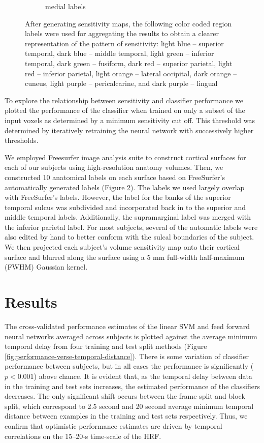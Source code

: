 \documentclass[preprint,5p,authoryear]{elsarticle}
\begin{document}
\begin{figure}
\begin{subfigure}{0.3\textwidth}
\caption{medial labels}
\label{fig:medial-labels}
\end{subfigure}
\caption{After generating sensitivity maps, the following color coded region labels were used for aggregating the results to obtain a clearer representation of the pattern of sensitivity: light blue -- superior temporal, dark blue -- middle temporal, light green -- inferior temporal, dark green -- fusiform, dark red -- superior parietal, light red -- inferior parietal, light orange -- lateral occipital, dark orange -- cuneus, light purple -- pericalcarine, and dark purple -- lingual}
\label{fig:labels}
\end{figure}

To  explore the relationship between sensitivity and classifier performance we plotted the performance of the classifier when trained on only a subset of the input voxels as determined by a minimum sensitivity cut off.
This threshold was determined by iteratively retraining the neural network with successively higher thresholds.

We employed Freesurfer image analysis suite to construct cortical surfaces for each of our subjects using high-resolution anatomy volumes.
Then, we constructed 10 anatomical labels on each surface based on FreeSurfer's automatically generated labels (Figure \ref{fig:labels}).
The labels we used largely overlap with FreeSurfer's labels.
However, the label for the banks of the superior temporal sulcus was subdivided and incorporated back in to the superior and middle temporal labels.
Additionally, the supramarginal label was merged with the inferior parietal label.
For most subjects, several of the automatic labels were also edited by hand to better conform with the sulcal boundaries of the subject.
We then projected each subject's volume sensitivity map onto their cortical surface and blurred along the surface using a 5 mm full-width half-maximum (FWHM) Gaussian kernel.

\section{Results}
The cross-validated performance estimates of the linear SVM and feed forward neural networks averaged across subjects is plotted against the average minimum temporal delay from four training and test split methods (Figure \ref{fig:performance-verse-temporal-distance}).
There is some variation of classifier performance between subjects, but in all cases the performance is significantly ($p < 0.001$) above chance. 
It is evident that, as the temporal delay between data in the training and test sets increases, the estimated performance of the classifiers decreases.
The only significant shift occurs between the frame split and block split, which correspond to 2.5 second and 20 second average minimum temporal distance between examples in the training and test sets respectively.
Thus, we confirm that optimistic performance estimates are driven by temporal correlations on the 15--20-s time-scale of the HRF.
\end{document}
